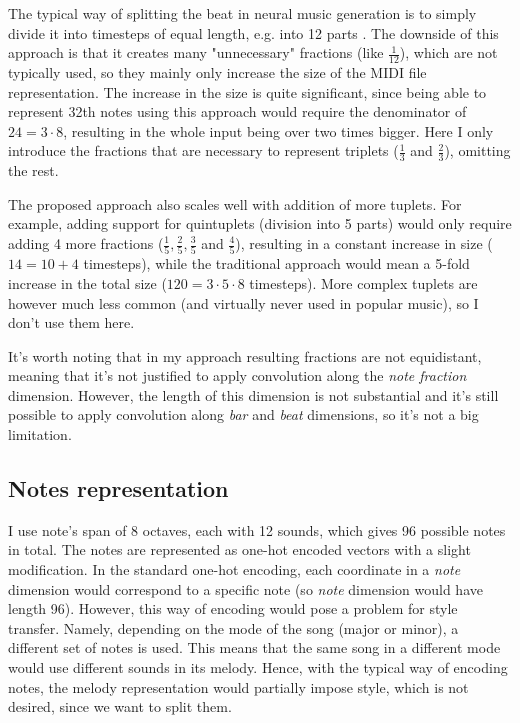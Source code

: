 \documentclass[en]{pracamgr}
\begin{document}
The typical way of splitting the beat in neural music generation is to simply divide it into timesteps of equal length, e.g. into 12 parts \cite{clara}.
The downside of this approach is that it creates many "unnecessary" fractions (like $\frac{1}{12}$), which are not typically used, so they mainly only increase the size of the MIDI file representation.
The increase in the size is quite significant, since being able to represent 32th notes using this approach would require the denominator of $24=3\cdot8$, resulting in the whole input being over two times bigger.
Here I only introduce the fractions that are necessary to represent triplets ($\frac{1}{3}$ and $\frac{2}{3}$), omitting the rest.

The proposed approach also scales well with addition of more tuplets.
For example, adding support for quintuplets (division into 5 parts) would only require adding 4 more fractions ($\frac{1}{5}, \frac{2}{5}, \frac{3}{5}$ and $\frac{4}{5}$), resulting in a constant increase in size ($14=10 + 4$ timesteps), while the traditional approach would mean a 5-fold increase in the total size ($120=3\cdot5\cdot8$ timesteps). More complex tuplets are however much less common (and virtually never used in popular music), so I don't use them here.

It's worth noting that in my approach resulting fractions are not equidistant, meaning that it's not justified to apply convolution along the \emph{note fraction} dimension.
However, the length of this dimension is not substantial and it's still possible to apply convolution along \emph{bar} and \emph{beat} dimensions, so it's not a big limitation.

\subsection{Notes representation}

I use note's span of 8 octaves, each with 12 sounds, which gives 96 possible notes in total.
The notes are represented as one-hot encoded vectors with a slight modification.
In the standard one-hot encoding, each coordinate in a \emph{note} dimension would correspond to a specific note (so \emph{note} dimension would have length 96).
However, this way of encoding would pose a problem for style transfer.
Namely, depending on the mode of the song (major or minor), a different set of notes is used.
This means that the same song in a different mode would use different sounds in its melody.
Hence, with the typical way of encoding notes, the melody representation would partially impose style, which is not desired, since we want to split them.
\end{document}
